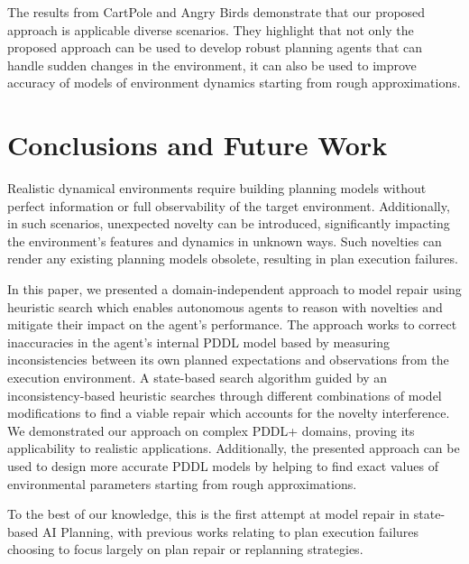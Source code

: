 \documentclass[letterpaper]{article} %
\begin{document}

The results from CartPole and Angry Birds demonstrate that our proposed approach is applicable diverse scenarios. They highlight that not only the proposed approach can be used to develop robust planning agents that can handle sudden changes in the environment, it can also be used to improve accuracy of models of environment dynamics starting from rough approximations.

\section{Conclusions and Future Work}
Realistic dynamical environments require building planning models without perfect information or full observability of the target environment. Additionally, in such scenarios, unexpected novelty can be introduced, significantly impacting the environment's features and dynamics in unknown ways. Such novelties can render any existing planning models obsolete, resulting in plan execution failures.


In this paper, we presented a domain-independent approach to model repair using heuristic search which enables autonomous agents to reason with novelties and mitigate their impact on the agent's performance. The approach works to correct inaccuracies in the agent's internal PDDL model based by measuring inconsistencies between its own planned expectations and observations from the execution environment. A state-based search algorithm guided by an inconsistency-based heuristic searches through different combinations of model modifications to find a viable repair which accounts for the novelty interference. We demonstrated our approach on complex PDDL+ domains, proving its applicability to realistic applications. Additionally, the presented approach can be used to design more accurate PDDL models by helping to find exact values of environmental parameters starting from rough approximations.

To the best of our knowledge, this is the first attempt at model repair in state-based AI Planning, with previous works relating to plan execution failures choosing to focus largely on plan repair or replanning strategies.
\end{document}
